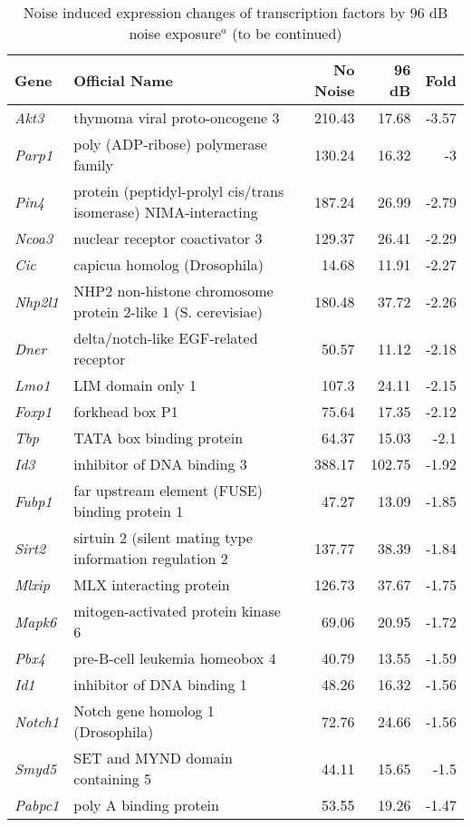 \documentclass{article}
\begin{document}
\begin{table} 
\caption{Noise induced expression changes of transcription factors by 96 dB noise exposure$^a$ (to be continued)}
\begin{small}
\begin{tabular}{l p{2.5in }rrr}
  \hline
 Gene& Official Name & No Noise & 96 dB & Fold \\ 
  \hline
{\it  Akt3 }& thymoma viral proto-oncogene 3 &210.43&17.68&-3.57 \\
{\it  Parp1 }& poly (ADP-ribose) polymerase family &130.24&16.32&-3 \\
{\it  Pin4 }& protein (peptidyl-prolyl cis/trans isomerase) NIMA-interacting &187.24&26.99&-2.79 \\
{\it  Ncoa3 }& nuclear receptor coactivator 3 &129.37&26.41&-2.29 \\
{\it  Cic }& capicua homolog (Drosophila) &14.68&11.91&-2.27 \\
{\it  Nhp2l1 }& NHP2 non-histone chromosome protein 2-like 1 (S. cerevisiae) &180.48&37.72&-2.26 \\
{\it  Dner }& delta/notch-like EGF-related receptor &50.57&11.12&-2.18 \\
{\it  Lmo1 }& LIM domain only 1 &107.3&24.11&-2.15 \\
{\it  Foxp1 }& forkhead box P1 &75.64&17.35&-2.12 \\
{\it  Tbp }& TATA box binding protein &64.37&15.03&-2.1 \\
{\it  Id3 }& inhibitor of DNA binding 3 &388.17&102.75&-1.92 \\
{\it  Fubp1 }& far upstream element (FUSE) binding protein 1 &47.27&13.09&-1.85 \\
{\it  Sirt2 }& sirtuin 2 (silent mating type information regulation 2 &137.77&38.39&-1.84 \\
{\it  Mlxip }& MLX interacting protein &126.73&37.67&-1.75 \\
{\it  Mapk6 }& mitogen-activated protein kinase 6 &69.06&20.95&-1.72 \\
{\it  Pbx4 }& pre-B-cell leukemia homeobox 4 &40.79&13.55&-1.59 \\
{\it  Id1 }& inhibitor of DNA binding 1 &48.26&16.32&-1.56 \\
{\it  Notch1 }& Notch gene homolog 1 (Drosophila) &72.76&24.66&-1.56 \\
{\it  Smyd5 }& SET and MYND domain containing 5 &44.11&15.65&-1.5 \\
{\it  Pabpc1 }& poly A binding protein &53.55&19.26&-1.47 \\

\end{tabular}
\end{small}
\end{table}
\end{document}
